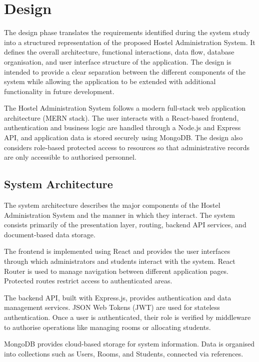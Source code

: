 \chapter{Design}

The design phase translates the requirements identified during the system study into a structured representation of the proposed Hostel Administration System. It defines the overall architecture, functional interactions, data flow, database organisation, and user interface structure of the application. The design is intended to provide a clear separation between the different components of the system while allowing the application to be extended with additional functionality in future development.

The Hostel Administration System follows a modern full-stack web application architecture (MERN stack). The user interacts with a React-based frontend, authentication and business logic are handled through a Node.js and Express API, and application data is stored securely using MongoDB. The design also considers role-based protected access to resources so that administrative records are only accessible to authorised personnel.

\section{System Architecture}

The system architecture describes the major components of the Hostel Administration System and the manner in which they interact. The system consists primarily of the presentation layer, routing, backend API services, and document-based data storage.

The frontend is implemented using React and provides the user interfaces through which administrators and students interact with the system. React Router is used to manage navigation between different application pages. Protected routes restrict access to authenticated areas.

The backend API, built with Express.js, provides authentication and data management services. JSON Web Tokens (JWT) are used for stateless authentication. Once a user is authenticated, their role is verified by middleware to authorise operations like managing rooms or allocating students.

MongoDB provides cloud-based storage for system information. Data is organised into collections such as Users, Rooms, and Students, connected via references.

